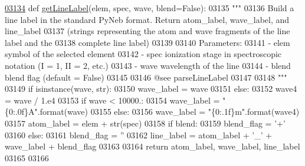 \begin{DoxyCode}
\hypertarget{namespacepyneb_1_1core_1_1pynebcore_l03134}{}\hyperlink{namespacepyneb_1_1core_1_1pynebcore_a14c882fc308d727f77ed33c1f56212e4}{03134} \textcolor{keyword}{def }\hyperlink{namespacepyneb_1_1core_1_1pynebcore_a14c882fc308d727f77ed33c1f56212e4}{getLineLabel}(elem, spec, wave, blend=False):
03135     \textcolor{stringliteral}{"""}
03136 \textcolor{stringliteral}{    Build a line label in the standard PyNeb format. Return atom\_label, wave\_label, and line\_label }
03137 \textcolor{stringliteral}{            (strings representing the atom and wave fragments of the line label and the }
03138 \textcolor{stringliteral}{                complete line label)}
03139 \textcolor{stringliteral}{    }
03140 \textcolor{stringliteral}{    Parameters:}
03141 \textcolor{stringliteral}{        - elem      symbol of the selected element}
03142 \textcolor{stringliteral}{        - spec      ionization stage in spectroscopic notation (I = 1, II = 2, etc.)}
03143 \textcolor{stringliteral}{        - wave      wavelength of the line}
03144 \textcolor{stringliteral}{        - blend     blend flag (default = False)}
03145 \textcolor{stringliteral}{}
03146 \textcolor{stringliteral}{    @see parseLineLabel}
03147 \textcolor{stringliteral}{    }
03148 \textcolor{stringliteral}{    """}    
03149     \textcolor{keywordflow}{if} isinstance(wave, str):
03150         wave\_label = wave
03151     \textcolor{keywordflow}{else}:
03152         wave4 = wave / 1.e4
03153         \textcolor{keywordflow}{if} wave < 10000.:
03154             wave\_label = \textcolor{stringliteral}{"\{0:.0f\}A"}.format(wave)
03155         \textcolor{keywordflow}{else}:
03156             wave\_label = \textcolor{stringliteral}{"\{0:.1f\}m"}.format(wave4)
03157     atom\_label = elem + str(spec)
03158     \textcolor{keywordflow}{if} blend:
03159         blend\_flag = \textcolor{stringliteral}{'+'}
03160     \textcolor{keywordflow}{else}:
03161         blend\_flag = \textcolor{stringliteral}{''}
03162     line\_label = atom\_label + \textcolor{stringliteral}{'\_'} + wave\_label + blend\_flag
03163 
03164     \textcolor{keywordflow}{return} atom\_label, wave\_label, line\_label
03165 
03166 
\end{DoxyCode}
\hypertarget{namespacepyneb_1_1core_1_1pynebcore_aba9d4a5306330dd47f8a51455514c017}{}
